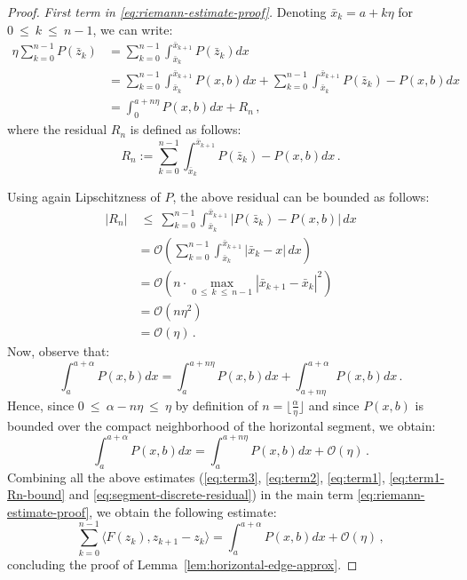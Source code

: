 \documentclass[a4paper,11pt,fullpage]{article}
\theoremstyle{plain}
\theoremstyle{definition}
\theoremstyle{plain}
\renewcommand{\leq}{~\le~}
\begin{document}
\begin{proof}
\noindent\textit{First term in \eqref{eq:riemann-estimate-proof}.} Denoting $\bar{x}_k = a + k \eta$ for $0 \leq k \leq n-1$, we can write: 
\begin{align}
\label{eq:term1}
\eta \sum_{k=0}^{n-1} P(\bar{z}_k) 
&= \sum_{k=0}^{n-1} \int_{\bar{x}_k}^{\bar{x}_{k+1}} P(\bar{z}_k) dx \nonumber\\
&= \sum_{k=0}^{n-1} \int_{\bar{x}_k}^{\bar{x}_{k+1}} P(x,b) dx 
+ \sum_{k=0}^{n-1} \int_{\bar{x}_k}^{\bar{x}_{k+1}} P(\bar{z}_k) -  P(x,b) dx \nonumber\\
&= \int_0^{a+n \eta} P(x,b) dx + R_n\,, 
\end{align}
where the residual $R_n$ is defined as follows: 
\begin{equation*}
R_n := \sum_{k=0}^{n-1} \int_{\bar{x}_k}^{\bar{x}_{k+1}} P(\bar{z}_k) - P(x,b) dx\,.
\end{equation*}

Using again Lipschitzness of $P$, the above residual can be bounded as follows: 
\begin{align}
\label{eq:term1-Rn-bound}
|R_n| &\leq \sum_{k=0}^{n-1} \int_{\bar{x}_k}^{\bar{x}_{k+1}} |P(\bar{z}_k) - P(x,b)| \,dx \nonumber\\ 
&= \mathcal{O}\left( \sum_{k=0}^{n-1} \int_{\bar{x}_k}^{\bar{x}_{k+1}} |\bar{x}_k - x| \,dx \right) \nonumber\\
&=  \mathcal{O}\left( n \cdot  \max_{0 \leq k \leq n-1} |\bar{x}_{k+1} - \bar{x}_k|^2 \right) \nonumber\\
&= \mathcal{O}(n \eta^2) \nonumber\\
&= \mathcal{O}(\eta)\,. 
\end{align}
Now, observe that: 
\begin{equation*}
\int_a^{a+\alpha} P(x,b) dx = \int_a^{a+n \eta} P(x,b) dx + \int_{a+n \eta}^{a+\alpha} P(x,b) dx\,.
\end{equation*}
Hence, since $0 \leq \alpha - n \eta \leq \eta$ by definition of $n = \lfloor \frac{\alpha}{\eta} \rfloor$ and since $P(x,b)$ is bounded over the compact neighborhood of the horizontal segment, we obtain: 
\begin{equation}
\label{eq:segment-discrete-residual}
\int_a^{a+\alpha} P(x,b) dx = \int_a^{a+n \eta} P(x,b) dx + \mathcal{O}(\eta)\,.
\end{equation}
Combining all the above estimates (\eqref{eq:term3}, \eqref{eq:term2}, \eqref{eq:term1}, \eqref{eq:term1-Rn-bound}  and \eqref{eq:segment-discrete-residual}) in the main term \eqref{eq:riemann-estimate-proof}, we obtain the following estimate: 
\begin{equation*}
\sum_{k=0}^{n-1} \langle F(z_k), z_{k+1} - z_k \rangle = \int_a^{a+\alpha} P(x,b) dx + \mathcal{O}(\eta)\,,
\end{equation*}
concluding the proof of Lemma~\ref{lem:horizontal-edge-approx}. 
\end{proof}
\end{document}

